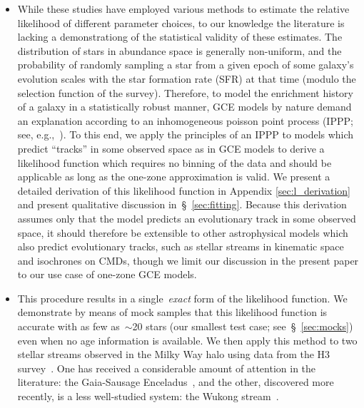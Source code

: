 \documentclass[ms.tex]{subfiles}
\begin{document}
\begin{itemize}
	\item While these studies have employed various methods to estimate the
	relative likelihood of different parameter choices, to our knowledge the
	literature is lacking a demonstrationg of the statistical validity of these
	estimates.
	The distribution of stars in abundance space is generally non-uniform, and
	the probability of randomly sampling a star from a given epoch of some
	galaxy's evolution scales with the star formation rate (SFR) at that time
	(modulo the selection function of the survey).
	Therefore, to model the enrichment history of a galaxy in a statistically
	robust manner, GCE models by nature demand an explanation according to an
	inhomogeneous poisson point process (IPPP; see, e.g.,~\citealp{Press2007}).
	To this end, we apply the principles of an IPPP to models which predict
	``tracks'' in some observed space as in GCE models to derive a likelihood
	function which requires no binning of the data and should be applicable as
	long as the one-zone approximation is valid.
	We present a detailed derivation of this likelihood function in Appendix
	\ref{sec:l_derivation} and present qualitative discussion
	in~\S~\ref{sec:fitting}.
	Because this derivation assumes only that the model predicts an
	evolutionary track in some observed space, it should therefore be
	extensible to other astrophysical models which also predict evolutionary
	tracks, such as stellar streams in kinematic space and isochrones on CMDs,
	though we limit our discussion in the present paper to our use case of
	one-zone GCE models.

	\item This procedure results in a single~\textit{exact} form of the
	likelihood function.
	We demonstrate by means of mock samples that this likelihood function is
	accurate with as few as~$\sim$20 stars (our smallest test case;
	see~\S~\ref{sec:mocks}) even when no age information is available.
	We then apply this method to two stellar streams observed in the Milky Way
	halo using data from the H3 survey~\citep{Conroy2019}.
	One has received a considerable amount of attention in the literature: the
	Gaia-Sausage Enceladus~\citep[GSE;][]{Belokurov2018, Helmi2018}, and
	the other, discovered more recently, is a less well-studied system: the
	Wukong stream~\citep{Naidu2020, Naidu2022}.



\end{itemize}
\end{document}
